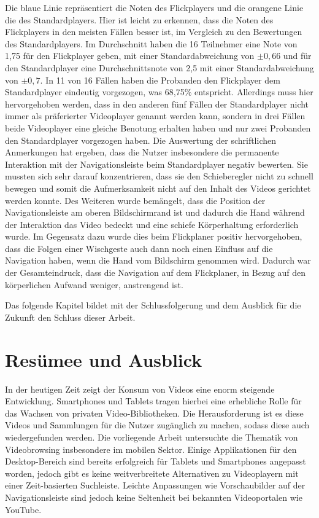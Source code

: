 \documentclass[11pt,a4paper]{report}
\begin{document}
Die blaue Linie repräsentiert die Noten des Flickplayers und die orangene Linie die des Standardplayers. Hier ist leicht zu erkennen, dass die Noten des Flickplayers in den meisten Fällen besser ist, im Vergleich zu den Bewertungen des Standardplayers. Im Durchschnitt haben die 16 Teilnehmer eine Note von 1,75 für den Flickplayer geben, mit einer Standardabweichung von  $\pm 0,66$ und für den Standardplayer eine Durchschnittsnote von 2,5 mit einer Standardabweichung von  $\pm 0,7$. In 11 von 16 Fällen haben die Probanden den Flickplayer dem Standardplayer eindeutig vorgezogen, was 68,75\% entspricht. Allerdings muss hier hervorgehoben werden, dass in den anderen fünf Fällen der Standardplayer nicht immer als präferierter Videoplayer genannt werden kann, sondern in drei Fällen beide Videoplayer eine gleiche Benotung erhalten haben und nur zwei Probanden den Standardplayer vorgezogen haben. Die Auswertung der schriftlichen Anmerkungen hat ergeben, dass die Nutzer insbesondere die permanente Interaktion mit der Navigationsleiste beim Standardplayer negativ bewerten. Sie mussten sich sehr darauf konzentrieren, dass sie den Schieberegler nicht zu schnell bewegen und somit die Aufmerksamkeit nicht auf den Inhalt des Videos gerichtet werden konnte. Des Weiteren wurde bemängelt, dass die Position der Navigationsleiste am oberen Bildschirmrand ist und dadurch die Hand während der Interaktion das Video bedeckt und eine schiefe Körperhaltung erforderlich wurde. Im Gegensatz dazu wurde dies beim Flickplaner positiv hervorgehoben, dass die Folgen einer Wischgeste auch dann noch einen Einfluss auf die Navigation haben, wenn die Hand vom Bildschirm genommen wird. Dadurch war der Gesamteindruck, dass die Navigation auf dem Flickplaner, in Bezug auf den körperlichen Aufwand weniger, anstrengend ist.

Das folgende Kapitel bildet mit der Schlussfolgerung und dem Ausblick für die Zukunft den Schluss dieser Arbeit.

\chapter{Resümee und Ausblick}

In der heutigen Zeit zeigt der Konsum von Videos eine enorm steigende Entwicklung. Smartphones und Tablets tragen hierbei eine erhebliche Rolle für das Wachsen von privaten Video-Bibliotheken. Die Herausforderung ist es diese Videos und Sammlungen für die Nutzer zugänglich zu machen, sodass diese auch wiedergefunden werden. Die vorliegende Arbeit untersuchte die Thematik von Videobrowsing insbesondere im mobilen Sektor. Einige Applikationen für den Desktop-Bereich sind bereits erfolgreich für Tablets und Smartphones angepasst worden, jedoch gibt es keine weitverbreitete Alternativen zu Videoplayern mit einer Zeit-basierten Suchleiste. Leichte Anpassungen wie Vorschaubilder auf der Navigationsleiste sind jedoch keine Seltenheit bei bekannten Videoportalen wie YouTube.
\end{document}
